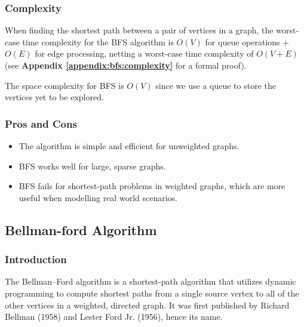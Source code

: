 		\subsubsection{Complexity}
			When finding the shortest path between a pair of vertices in a graph, the worst-case time complexity for the BFS algorithm is $O(V)$ for queue operations + $O(E)$ for edge processing, netting a worst-case time complexity of $O(V + E)$ (see \textbf{Appendix \ref{appendix:bfs:complexity}} for a formal proof). \medskip
			
			The space complexity for BFS is $O(V)$ since we use a queue to store the vertices yet to be explored.
		
		\subsubsection{Pros and Cons}
			\begin{itemize}
				\item The algorithm is simple and efficient for unweighted graphs.
				\item BFS works well for large, sparse graphs.
				\item BFS fails for shortest-path problems in weighted graphs, which are more useful when modelling real world scenarios.
			\end{itemize}
	\subsection{Bellman-ford Algorithm}
		\subsubsection{Introduction}
			The Bellman–Ford algorithm is a shortest-path algorithm that utilizes dynamic programming to compute shortest paths from a single source vertex to all of the other vertices in a weighted, directed graph. It was first published by Richard Bellman (1958) and Lester Ford Jr. (1956), hence its name.
